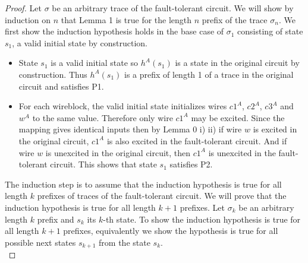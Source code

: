 \documentclass[12pt]{report}
\begin{document}
\begin{proof}
Let $\sigma$ be an arbitrary trace of the fault-tolerant circuit.  We will show by induction on $n$ that Lemma 1 is true for the length $n$ prefix of the trace $\sigma_n$.  
We first show the induction hypothesis holds in the base case of $\sigma_1$ consisting of state $s_1$, a valid initial state by construction.
\begin{itemize}
\item State $s_1$ is a valid initial state so $h^A(s_1)$ is a state in the original circuit by construction. %
 Thus $h^A(s_1)$ is a prefix of length 1 of a trace in the original circuit and satisfies P1.
\item 
For each wireblock, the valid initial state initializes wires $c1^A$, $c2^A$, $c3^A$ and $w^A$ to the same value.  Therefore only wire $c1^A$ may be excited.  Since the mapping gives identical inputs then by Lemma 0 i) ii) if wire $w$ is excited in the original circuit, $c1^A$ is also excited in the fault-tolerant circuit.
And if wire $w$ is unexcited in the original circuit, then $c1^A$ is unexcited in the fault-tolerant circuit.  This shows that state $s_1$ satisfies P2.    %
\end{itemize}

The induction step is to assume that the induction hypothesis is true for all length $k$ prefixes of traces of the fault-tolerant circuit.  We will prove that the induction hypothesis is true for all length $k+1$ prefixes.  %
Let $\sigma_k$ be an arbitrary length $k$ prefix and $s_k$ its $k$-th state.  
To show the induction hypothesis is true for all length $k+1$ prefixes, equivalently we show the hypothesis is true for all possible next states $s_{k+1}$ from the state $s_k$.\\


\end{proof}
\end{document}
